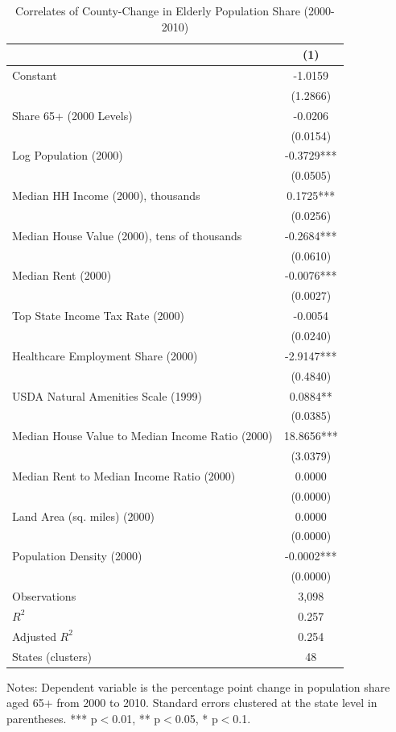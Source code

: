 \begin{table}[htbp]
\centering
\caption{Correlates of County-Change in Elderly Population Share (2000-2010)}
\label{tab:elderly_regression}
\begin{tabular}{lc}
\hline
& (1) \\
\hline
Constant & -1.0159 \\
 & (1.2866) \\
[0.5em]
Share 65+ (2000 Levels) & -0.0206 \\
 & (0.0154) \\
[0.5em]
Log Population (2000) & -0.3729*** \\
 & (0.0505) \\
[0.5em]
Median HH Income (2000), thousands & 0.1725*** \\
 & (0.0256) \\
[0.5em]
Median House Value (2000), tens of thousands & -0.2684*** \\
 & (0.0610) \\
[0.5em]
Median Rent (2000) & -0.0076*** \\
 & (0.0027) \\
[0.5em]
Top State Income Tax Rate (2000) & -0.0054 \\
 & (0.0240) \\
[0.5em]
Healthcare Employment Share (2000) & -2.9147*** \\
 & (0.4840) \\
[0.5em]
USDA Natural Amenities Scale (1999) & 0.0884** \\
 & (0.0385) \\
[0.5em]
Median House Value to  Median Income Ratio (2000) & 18.8656*** \\
 & (3.0379) \\
[0.5em]
Median Rent to  Median Income Ratio (2000) & 0.0000 \\
 & (0.0000) \\
[0.5em]
Land Area (sq. miles) (2000) & 0.0000 \\
 & (0.0000) \\
[0.5em]
Population Density (2000) & -0.0002*** \\
 & (0.0000) \\
\hline
Observations & 3,098 \\
$R^2$ & 0.257 \\
Adjusted $R^2$ & 0.254 \\
States (clusters) & 48 \\
\hline
\end{tabular}
\begin{tablenotes}
\footnotesize
\item Notes: Dependent variable is the percentage point change in population share aged 65+ from 2000 to 2010. Standard errors clustered at the state level in parentheses. *** p$<$0.01, ** p$<$0.05, * p$<$0.1.
\end{tablenotes}
\end{table}
